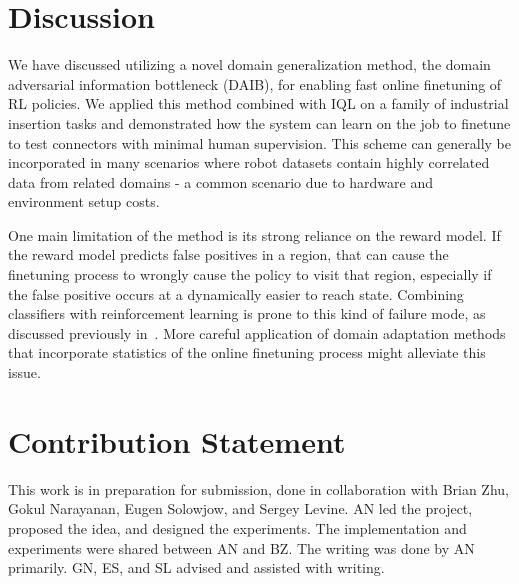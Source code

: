


\section{Discussion}

We have discussed utilizing a novel domain generalization method, the domain adversarial information bottleneck (DAIB), for enabling fast online finetuning of RL policies.
We applied this method combined with IQL on a family of industrial insertion tasks and demonstrated how the system can learn on the job to finetune to test connectors with minimal human supervision.
This scheme can generally be incorporated in many scenarios where robot datasets contain highly correlated data from related domains - a common scenario due to hardware and environment setup costs.

One main limitation of the method is its strong reliance on the reward model. If the reward model predicts false positives in a region, that can cause the finetuning process to wrongly cause the policy to visit that region, especially if the false positive occurs at a dynamically easier to reach state. Combining classifiers with reinforcement learning is prone to this kind of failure mode, as discussed previously in~\cite{fu2018vice}. More careful application of domain adaptation methods that incorporate statistics of the online finetuning process might alleviate this issue.

\section{Contribution Statement}

This work is in preparation for submission, done in collaboration with Brian Zhu, Gokul Narayanan, Eugen Solowjow, and Sergey Levine. AN led the project, proposed the idea, and designed the experiments. The implementation and experiments were shared between AN and BZ. The writing was done by AN primarily. GN, ES, and SL advised and assisted with writing.


% 
% 

% 

